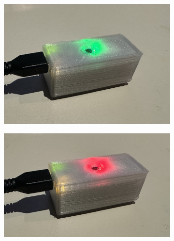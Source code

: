 \begin{figure}[h!]
	\centering
	
	\begin{subfigure}{0.3\textwidth}
		\includegraphics[width=\linewidth]{Images/Results/ArduinoGreen}
		\caption{}    %
		\label{subfig:ArduinoGreen}
	\end{subfigure}
	\hfill
	\begin{subfigure}{0.3\textwidth}
		\includegraphics[width=\linewidth]{Images/Results/ArduinoRed}
		\caption{}    %
		\label{subfig:ArduinoRed}
	\end{subfigure}
	\hfill
	\begin{subfigure}{0.3\textwidth}

\end{subfigure}
\end{figure}
